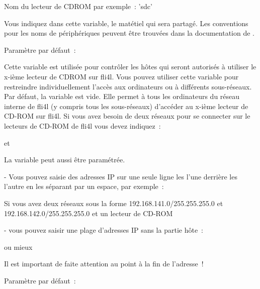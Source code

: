 \begin{description}

    Nom du lecteur de CDROM par exemple~: 'sdc'

        Vous indiquez dans cette variable, le matétiel qui sera partagé. Les
        conventions pour les noms de périphériques peuvent être trouvées dans
        la documentation de .


        Paramètre par défaut~: 

\end{description}


\begin{description}

        Cette variable est utilisée pour contrôler les hôtes qui seront autorisés
        à utiliser le x-ième lecteur de CDROM sur fli4l. Vous pouvez utiliser cette
        variable pour restreindre individuellement l'accès aux ordinateurs ou à
        différents sous-réseaux. Par défaut, la variable est vide. Elle permet à
        tous les ordinateurs du réseau interne de fli4l (y compris tous les
        sous-réseaux) d'accéder au x-ième lecteur de CD-ROM sur fli4l. Si vous
        avez besoin de deux réseaux pour se connecter sur le lecteurs de CD-ROM
        de fli4l vous devez indiquez~:


          et


        La variable  peut aussi être paramétrée.

        - Vous pouvez saisie des adresses IP sur une seule ligne les l'une derrière
        les l'autre en les séparant par un espace, par exemple~:


        Si vous avez deux réseaux sous la forme 192.168.141.0/255.255.255.0 et
        192.168.142.0/255.255.255.0 et un lecteur de CD-ROM

        - vous pouvez saisir une plage d'adresses IP sans la partie hôte~:


          ou mieux


          Il est important de faite attention au point à la fin de l'adresse~!

        Paramètre par défaut~: 

\end{description}


